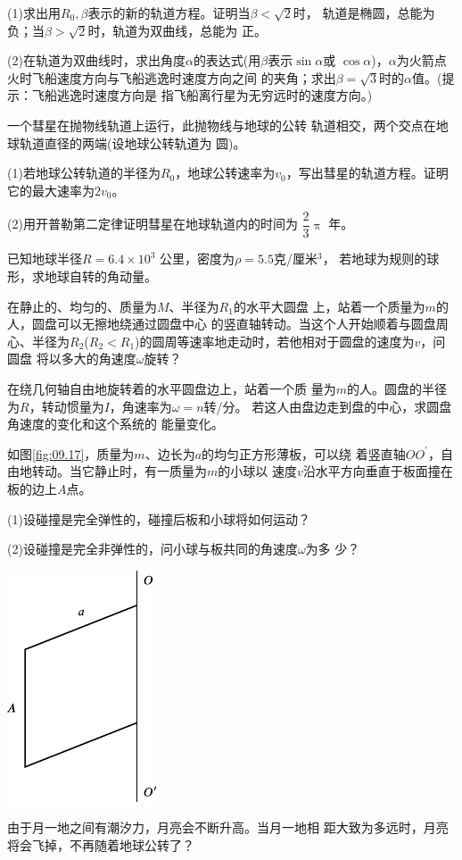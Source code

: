 \begin{exercises}
(1)求出用$ R _ 0, \beta $表示的新的轨道方程。证明当$  \beta < \sqrt { 2 }   $时，
轨道是椭圆，总能为负；当$  \beta > \sqrt { 2 }   $时，轨道为双曲线，总能为
正。

(2)在轨道为双曲线时，求出角度$ \alpha $的表达式(用$ \beta $表示$ \sin \alpha $或
$ \cos \alpha $)，$ \alpha $为火箭点火时飞船速度方向与飞船逃逸时速度方向之间
的夹角；求出$  \beta = \sqrt { 3 }   $时的$ \alpha $值。(提示：飞船逃逸时速度方向是
指飞船离行星为无穷远时的速度方向。)

\exercise 一个彗星在抛物线轨道上运行，此抛物线与地球的公转
轨道相交，两个交点在地球轨道直径的两端(设地球公转轨道为
圆)。

(1)若地球公转轨道的半径为$ R _ 0 $，地球公转速率为$  v _ { 0 }   $，写出彗星的轨道方程。证明它的最大速率为$  2 v _ { 0 } $。

(2)用开普勒第二定律证明彗星在地球轨道内的时间为
$ \dfrac { 2 } { 3 } \uppi  $
年。

\exercise 已知地球半径$  R = 6 . 4 \times 1 0 ^ { 3 }  $ 公里，密度为$  \rho = 5 . 5   $克/厘米$ ^ 3 $，
若地球为规则的球形，求地球自转的角动量。

\exercise 在静止的、均匀的、质量为$ M $、半径为$ R _ 1 $的水平大圆盘
上，站着一个质量为$ m $的人，圆盘可以无擦地绕通过圆盘中心
的竖直轴转动。当这个人开始顺着与圆盘周心、半径为$  R _ { 2 }  $($  R _ { 2 } < 
R _ { 1 }  $)的圆周等速率地走动时，若他相对于圆盘的速度为$ v $，问圆盘
将以多大的角速度$ \omega $旋转？

\exercise 在绕几何轴自由地旋转着的水平圆盘边上，站着一个质
量为$ m $的人。圆盘的半径为$ R $，转动惯量为$ I $，角速率为$  \omega = n  $转/分。
若这人由盘边走到盘的中心，求圆盘角速度的变化和这个系统的
能量变化。

\exercise 如图\ref{fig:09.17}，质量为$ m $、边长为$ a $的均匀正方形薄板，可以绕
着竖直轴$  O O ^ { \prime }   $，自由地转动。当它静止时，有一质量为$ m $的小球以
速度$ v $沿水平方向垂直于板面撞在板的边上$ A $点。

(1)设碰撞是完全弹性的，碰撞后板和小球将如何运动？

(2)设碰撞是完全非弹性的，问小球与板共同的角速度$ \omega $为多
少？
\begin{figurex}
    \centering
    \includegraphics{figure/fig09.17}
    \caption{}
    \label{fig:09.17}
\end{figurex}

\exercise 由于月一地之间有潮汐力，月亮会不断升高。当月一地相
距大致为多远时，月亮将会飞掉，不再随着地球公转了？

\end{exercises}